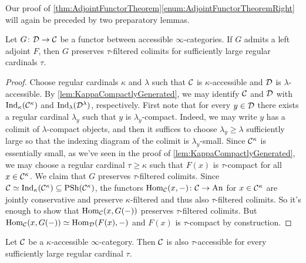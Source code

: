 Our proof of \cref{thm:AdjointFunctorTheorem}\cref{enum:AdjointFunctorTheoremRight} will again be preceded by two preparatory lemmas.
\begin{lem}\label{lem:RightAdjointsAccessible}
	Let $G\colon \mathcal{D}\rightarrow\mathcal{C}$ be a functor between accessible $\infty$-categories. If $G$ admits a left adjoint $F$, then $G$ preserves $\tau$-filtered colimits for sufficiently large regular cardinals $\tau$.
\end{lem}
\begin{proof}
	Choose regular cardinals $\kappa$ and $\lambda$ such that $\mathcal{C}$ is $\kappa$-accessible and $\mathcal{D}$ is $\lambda$-accessible. By \cref{lem:KappaCompactlyGenerated}, we may identify $\mathcal{C}$ and $\mathcal{D}$ with $\mathrm{Ind}_\kappa(\mathcal{C}^\kappa)$ and $\mathrm{Ind}_\lambda(\mathcal{D}^\lambda)$, respectively. First note that for every $y\in\mathcal{D}$ there exists a regular cardinal $\lambda_y$ such that $y$ is $\lambda_y$-compact. Indeed, we may write $y$ has a colimit of $\lambda$-compact objects, and then it suffices to choose $\lambda_y\geqslant \lambda$ sufficiently large so that the indexing diagram of the colimit is $\lambda_y$-small. Since $\mathcal{C}^\kappa$ is essentially small, as we've seen in the proof of \cref{lem:KappaCompactlyGenerated}, we may choose a regular cardinal $\tau\geqslant \kappa$ such that $F(x)$ is $\tau$-compact for all $x\in\mathcal{C}^\kappa$. We claim that $G$ preserves $\tau$-filtered colimits. Since $\mathcal{C}\simeq\mathrm{Ind}_\kappa(\mathcal{C}^\kappa)\subseteq \operatorname{PSh}(\mathcal{C}^\kappa)$, the functors $\operatorname{Hom}_{\mathcal{C}}(x,-)\colon \mathcal{C}\rightarrow \mathrm{An}$ for $x\in\mathcal{C}^\kappa$ are jointly conservative and preserve $\kappa$-filtered and thus also $\tau$-filtered colimits. So it's enough to show that $\operatorname{Hom}_{\mathcal{C}}(x,G(-))$ preserves $\tau$-filtered colimits. But $\operatorname{Hom}_{\mathcal{C}}(x,G(-))\simeq \operatorname{Hom}_{\mathcal{D}}(F(x),-)$ and $F(x)$ is $\tau$-compact by construction.
\end{proof}
\begin{lem}\label{lem:Accessible}
	Let $\mathcal{C}$ be a $\kappa$-accessible $\infty$-category. Then $\mathcal{C}$ is also $\tau$-accessible for every sufficiently large regular cardinal $\tau$.
\end{lem}
